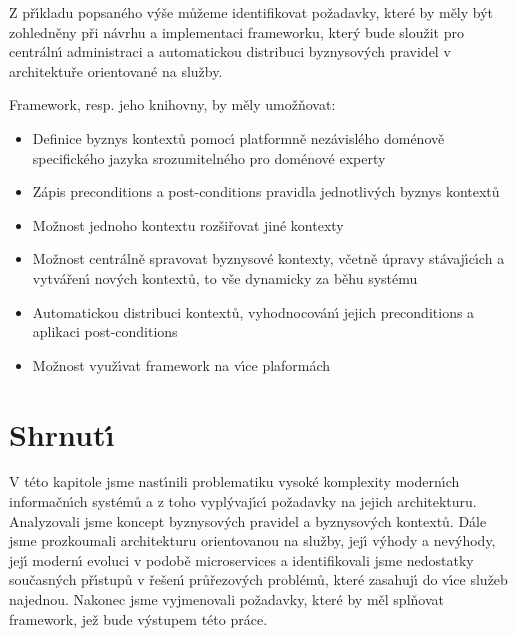 Z př\'{\i}kladu popsaného v\'yše můžeme identifikovat požadavky, které by měly
b\'yt zohledněny při návrhu a implementaci frameworku, kter\'y bude sloužit
pro centráln\'{\i} administraci a automatickou distribuci byznysov\'ych pravidel
v architektuře orientované na služby.


Framework, resp. jeho knihovny, by měly umožňovat:

\begin{itemize}
    \item{Definice byznys kontextů pomoc\'{\i} platformně nezávislého doménově specifického jazyka srozumitelného pro doménové experty}
    \item{Zápis preconditions a post-conditions pravidla jednotliv\'ych byznys kontextů}
    \item{Možnost jednoho kontextu rozšiřovat jiné kontexty}
    \item{Možnost centrálně spravovat byznysové kontexty, včetně úpravy stávaj\'{\i}c\'{\i}ch a vytvářen\'{\i} nov\'ych kontextů, to vše dynamicky za běhu systému}
    \item{Automatickou distribuci kontextů, vyhodnocován\'{\i} jejich preconditions a aplikaci post-conditions}
    \item{Možnost využ\'{\i}vat framework na v\'{\i}ce plaformách}
\end{itemize}

\section{Shrnut\'{\i}}

V této kapitole jsme nast\'{\i}nili problematiku vysoké komplexity modern\'{\i}ch informačn\'{\i}ch systémů
a z toho vypl\'yvaj\'{\i}c\'{\i} požadavky na jejich architekturu. Analyzovali jsme koncept byznysov\'ych
pravidel a byznysov\'ych kontextů. Dále jsme prozkoumali architekturu orientovanou na služby, jej\'{\i}
v\'yhody a nev\'yhody, jej\'{\i} modern\'{\i} evoluci v podobě microservices a identifikovali jsme nedostatky
současn\'ych př\'{\i}stupů v řešen\'{\i} průřezov\'ych problémů, které zasahuj\'{\i} do v\'{\i}ce služeb najednou. Nakonec
jsme vyjmenovali požadavky, které by měl splňovat framework, jež bude v\'ystupem této práce.
